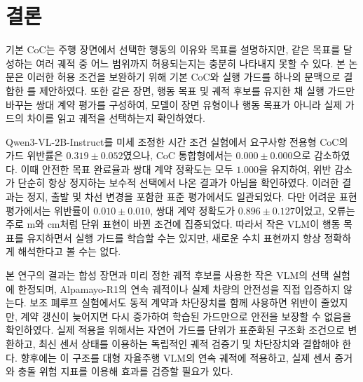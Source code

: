 \section{결론}
\label{sec:conclusion}

기본 CoC는 주행 장면에서 선택한 행동의 이유와 목표를 설명하지만, 같은 목표를 달성하는 여러 궤적 중 어느 범위까지 허용되는지는 충분히 나타내지 못할 수 있다. 본 논문은 이러한 허용 조건을 보완하기 위해 기본 CoC와 실행 가드를 하나의 문맥으로 결합한 \sccoc{}를 제안하였다. 또한 같은 장면, 행동 목표 및 궤적 후보를 유지한 채 실행 가드만 바꾸는 쌍대 계약 평가를 구성하여, 모델이 장면 유형이나 행동 목표가 아니라 실제 가드의 차이를 읽고 궤적을 선택하는지 확인하였다.

Qwen3-VL-2B-Instruct를 미세 조정한 시간 조건 실험에서 요구사항 전용형 CoC의 가드 위반률은 $0.319\pm0.052$였으나, CoC 통합형에서는 $0.000\pm0.000$으로 감소하였다. 이때 안전한 목표 완료율과 쌍대 계약 정확도는 모두 $1.000$을 유지하여, 위반 감소가 단순히 항상 정지하는 보수적 선택에서 나온 결과가 아님을 확인하였다. 이러한 결과는 정지, 출발 및 차선 변경을 포함한 표준 평가에서도 일관되었다. 다만 어려운 표현 평가에서는 위반률이 $0.010\pm0.010$, 쌍대 계약 정확도가 $0.896\pm0.127$이었고, 오류는 주로 m와 cm처럼 단위 표현이 바뀐 조건에 집중되었다. 따라서 작은 VLM이 행동 목표를 유지하면서 실행 가드를 학습할 수는 있지만, 새로운 수치 표현까지 항상 정확하게 해석한다고 볼 수는 없다.

본 연구의 결과는 합성 장면과 미리 정한 궤적 후보를 사용한 작은 VLM의 선택 실험에 한정되며, Alpamayo-R1의 연속 궤적이나 실제 차량의 안전성을 직접 입증하지 않는다. 보조 폐루프 실험에서도 동적 계약과 차단장치를 함께 사용하면 위반이 줄었지만, 계약 갱신이 늦어지면 다시 증가하여 학습된 가드만으로 안전을 보장할 수 없음을 확인하였다. 실제 적용을 위해서는 자연어 가드를 단위가 표준화된 구조화 조건으로 변환하고, 최신 센서 상태를 이용하는 독립적인 궤적 검증기 및 차단장치와 결합해야 한다. 향후에는 이 구조를 대형 자율주행 VLM의 연속 궤적에 적용하고, 실제 센서 증거와 충돌 위험 지표를 이용해 효과를 검증할 필요가 있다.
